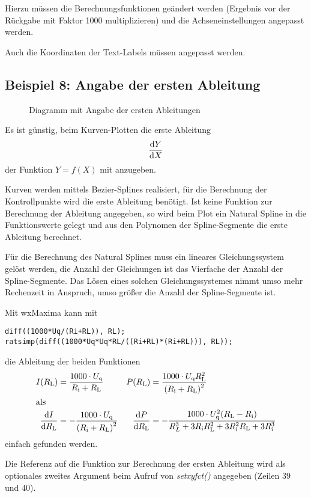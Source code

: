 \documentclass[ngerman,origlongtable]{scrartcl}
\newcommand{\includepgfimage}[2]{%
\begin{figure}%
{\centering%
\caption{#2}\label{fig:#1}%
}%
\end{figure}%
}
\begin{document}
Hierzu müssen die Berechnungsfunktionen geändert werden (Ergebnis
vor der Rückgabe mit Faktor 1000 multiplizieren) und die Achseneinstellungen
angepasst werden.

Auch die Koordinaten der Text-Labels müssen angepasst werden.

\clearpage
\subsection[Ableitung angeben]{Beispiel 8: Angabe der ersten Ableitung}
\includepgfimage{../examples/test008a}{Diagramm mit Angabe der ersten Ableitungen}
Es ist günstig, beim Kurven-Plotten die erste Ableitung
\begin{align*}\frac{\mathrm{d} Y}{\mathrm{d} X}\end{align*}
der Funktion \(Y=f(X)\) mit anzugeben.

Kurven werden mittels Bezier-Splines realisiert, für die Berechnung der
Kontrollpunkte wird die erste Ableitung benötigt.
Ist keine Funktion zur Berechnung der Ableitung angegeben, so wird beim
Plot ein Natural Spline in die Funktionswerte gelegt und aus den Polynomen
der Spline-Segmente die erste Ableitung berechnet.

Für die Berechnung des Natural Splines muss ein lineares Gleichungssystem
gelöst werden, die Anzahl der Gleichungen ist das Vierfache der Anzahl der
Spline-Segmente. Das Lösen eines solchen Gleichungssystemes nimmt umso mehr
Rechenzeit in Anspruch, umso größer die Anzahl der Spline-Segmente ist.

Mit wxMaxima kann mit
\begin{lstlisting}
diff((1000*Uq/(Ri+RL)), RL);
ratsimp(diff((1000*Uq*Uq*RL/((Ri+RL)*(Ri+RL))), RL));
\end{lstlisting}
die Ableitung der beiden Funktionen 
\begin{align*}
I(R_{\text{L}})&=\frac{1000\cdot{}U_{\text{q}}}{R_{\text{i}}+R_{\text{L}}}&P(R_{\text{L}})&=\frac{1000\cdot{}U_{\text{q}}R_{\text{L}}^2}{{(R_{\text{i}}+R_{\text{L}})}^2}\\
\intertext{als}
\frac{\mathrm{d} I}{\mathrm{d} R_{\text{L}}}&=-\frac{1000\cdot{}U_{\text{q}}}{{(R_{\text{i}}+R_{\text{L}})}^2}&\frac{\mathrm{d} P}{\mathrm{d} R_{\text{L}}}&=-\frac{1000\cdot{} U_{\text{q}}^2(R_{\text{L}}-R_{\text{i}})}{R_{\text{}L}^3+3R_{\text{i}}R_{\text{L}}^2+3R_{\text{i}}^2R_{\text{L}}+3R_{\text{i}}^3}\end{align*}
einfach gefunden werden.

Die Referenz auf die Funktion zur Berechnung der ersten Ableitung wird als
optionales zweites Argument beim Aufruf von
\textit{set\textunderscore{}xy\textunderscore{}fct()\/} angegeben
(Zeilen 39 und 40).

\clearpage
\end{document}
